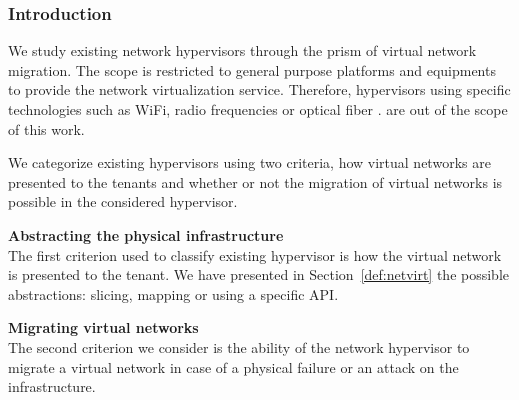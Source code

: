 \subsubsection{Introduction}
We study existing network hypervisors through the prism of virtual network migration.
The scope is restricted to general purpose platforms and equipments to provide the network virtualization service. Therefore, hypervisors using specific technologies such as WiFi, radio frequencies or optical fiber \etc. are out of the scope of this work.

We categorize existing hypervisors using two criteria, how virtual networks are presented to the tenants and whether or not the migration of virtual networks is possible in the considered hypervisor.

\textbf{Abstracting the physical infrastructure\\}
The first criterion used to classify existing hypervisor is how the virtual network is presented to the tenant. We have presented in Section~\ref{def:netvirt} the possible abstractions: slicing, mapping or using a specific API. 

\textbf{Migrating virtual networks\\}
The second criterion we consider is the ability of the network hypervisor to migrate a virtual network in case of a physical failure or an attack on the infrastructure.


